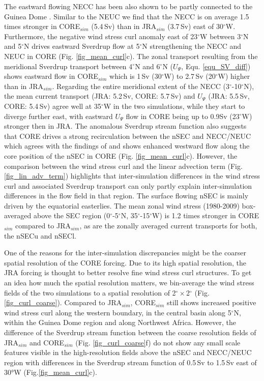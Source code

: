 \documentclass[os, manuscript]{copernicus}
\begin{document}
	The eastward flowing NECC has been also shown to be partly connected to the Guinea Dome \citep{Stramma2005,Hormann2012,Stramma2016}. Similar to the NEUC we find that the NECC is on average 1.5 times stronger in CORE$_{sim}$ (5.4$ \, $Sv) than in JRA$_{sim}$  (3.7$ \, $Sv) east of 30$^{\circ}$W. Furthermore, the negative wind stress curl anomaly east of 23$^{\circ}$W between 3$^{\circ}$N and 5$^{\circ}$N drives eastward Sverdrup flow at 5$^{\circ}$N strengthening the NECC and NEUC in CORE (Fig. \ref{fig_mean_curl}c). The zonal transport resulting from the meridional Sverdrup transport between 4$^{\circ}$N and 6$^{\circ}$N ($ U_{\Psi} $, Equ. \ref{equ_SV_diff}) shows eastward flow in CORE$_{sim}$ which is 1$\,$Sv (30$^{\circ}$W) to 2.7$\,$Sv (20$^{\circ}$W) higher than in JRA$_{sim}$. Regarding the entire meridional extent of the NECC (3$^{\circ}$-10$^{\circ}$N), the mean current transport (JRA: 5.2$\,$Sv, CORE: 5.7$\,$Sv) and $ U_{\Psi} $ (JRA: 5.5$\,$Sv, CORE: 5.4$\,$Sv) agree well at 35$^{\circ}$W in the two simulations, while they start to diverge further east, with eastward $ U_{\Psi} $ flow in CORE being up to 0.9Sv (23$^{\circ}$W) stronger then in JRA. The anomalous Sverdrup stream function also suggests that CORE drives a strong recirculation between the nSEC and NECC/NEUC which agrees with the findings of \cite{Burmeister2019} and shows enhanced westward flow along the core position of the nSEC in CORE (Fig. \ref{fig_mean_curl}c). However, the comparison between the wind stress curl and the linear advection term (Fig.\ref{fig_lin_adv_term}) highlights that inter-simulation differences in the wind stress curl and associated Sverdrup transport can only partly explain inter-simulation differences in the flow field in that region. The surface flowing nSEC is mainly driven by the equatorial easterlies. The mean zonal wind stress (1980-2009) box-averaged above the SEC region (0$^{\circ}$-5$^{\circ}$N, 35$^{\circ}$-15$^{\circ}$W) is 1.2 times stronger in CORE$_{sim}$ compared to JRA$_{sim}$, as are the zonally averaged current transports for both, the nSECu and nSECl.
	
	One of the reasons for the inter-simulation discrepancies might be the coarser spatial resolution of the CORE forcing. Due to its high spatial resolution, the JRA forcing is thought to better resolve fine wind stress curl structures. To get an idea how much the spatial resolution matters, we bin-average the wind stress fields of the two simulations to a spatial resolution of 2$^{\circ} \times$2$^{\circ}$ (Fig. \ref{fig_curl_coarse}). Compared to JRA$_{sim}$, CORE$_{sim}$ still shows increased positive wind stress curl along the western boundary, in the central basin along 5$^{\circ}$N, within the Guinea Dome region and along Northwest Africa. However, the difference of the Sverdrup stream function between the coarse resolution fields of JRA$_{sim}$ and CORE$_{sim}$ (Fig. \ref{fig_curl_coarse}f) do not show any small scale features visible in the high-resolution fields above the nSEC and NECC/NEUC region with differences in the Sverdrup stream function of 0.5$\,$Sv to 1.5$\,$Sv east of 30°W (Fig.\ref{fig_mean_curl}c).
	
\end{document}
